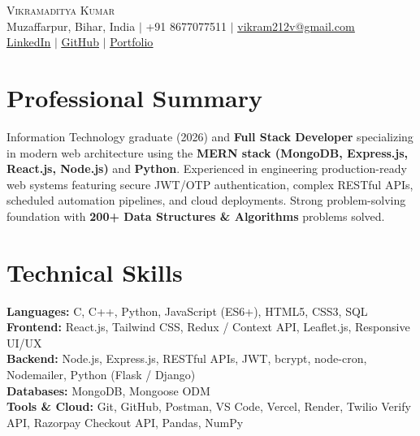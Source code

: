 \documentclass[letterpaper,10pt]{article}
\begin{document}
\begin{center}
    {\Huge \scshape Vikramaditya Kumar} \\ \vspace{2pt}
    Muzaffarpur, Bihar, India $|$ +91 8677077511 $|$ \href{mailto:vikram212v@gmail.com}{\underline{vikram212v@gmail.com}} \\ \vspace{2pt}
    \href{https://linkedin.com/in/vikramaditya-kumar}{\underline{LinkedIn}} $|$
    \href{https://github.com/Vikramaditya21N}{\underline{GitHub}} $|$
    \href{https://portfolio-beta-orpin-62.vercel.app/}{\underline{Portfolio}}
\end{center}

\section{Professional Summary}
Information Technology graduate (2026) and \textbf{Full Stack Developer} specializing in modern web architecture using the \textbf{MERN stack (MongoDB, Express.js, React.js, Node.js)} and \textbf{Python}. Experienced in engineering production-ready web systems featuring secure JWT/OTP authentication, complex RESTful APIs, scheduled automation pipelines, and cloud deployments. Strong problem-solving foundation with \textbf{200+ Data Structures \& Algorithms} problems solved.

\section{Technical Skills}
\begin{itemize}[leftmargin=0.15in, label={}]
    \small{\item{
     \textbf{Languages:}{ C, C++, Python, JavaScript (ES6+), HTML5, CSS3, SQL} \\
     \textbf{Frontend:}{ React.js, Tailwind CSS, Redux / Context API, Leaflet.js, Responsive UI/UX} \\
     \textbf{Backend:}{ Node.js, Express.js, RESTful APIs, JWT, bcrypt, node-cron, Nodemailer, Python (Flask / Django)} \\
     \textbf{Databases:}{ MongoDB, Mongoose ODM} \\
     \textbf{Tools \& Cloud:}{ Git, GitHub, Postman, VS Code, Vercel, Render, Twilio Verify API, Razorpay Checkout API, Pandas, NumPy}
    }}
\end{itemize}
\end{document}
